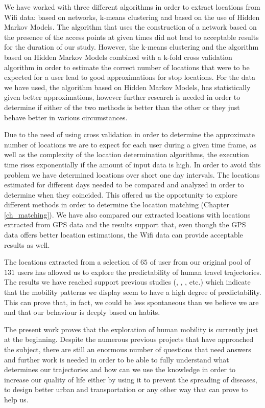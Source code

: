 We have worked with three different algorithms in order to extract locations
from Wifi data: based on networks, k-means clustering and based on the use of
Hidden Markov Models. The algorithm that uses the construction of a network
based on the presence of the access points at given times did not lead to
acceptable results for the duration of our study. However, the k-means
clustering and the algorithm based on Hidden Markov Models combined with a
k-fold cross validation algorithm in order to estimate the correct number of
locations that were to be expected for a user lead to good approximations for
stop locations. For the data we have used, the algorithm based on Hidden Markov
Models, has statistically given better approximations, however further research
is needed in order to determine if either of the two methods is better than the
other or they just behave better in various circumstances.

Due to the need of using cross validation in order to determine the approximate
number of locations we are to expect for each user during a given time frame, as
well as the complexity of the location determination algorithms, the execution
time rises exponentially if the amount of input data is high. In order to avoid
this problem we have determined locations over short one day intervals. The
locations estimated for different days needed to be compared and analyzed in
order to determine when they coincided. This offered us the opportunity to
explore different methods in order to determine the location matching (Chapter
\ref{ch_matching}). We have also compared our extracted locations with locations
extracted from GPS data and the results support that, even though the GPS data
offers better location estimations, the Wifi data can provide acceptable
results as well.

The locations extracted from a selection of $65$ of user from our original pool
of $131$ users has allowed us to explore the predictability of human travel
trajectories. The results we have reached support previous studies
(\cite{Barabasi10}, \cite{Barabasi08}, \cite{Sinatra14}, \cite{Brockmann06}
etc.) which indicate that the mobility patterns we display seem to have a high
degree of predictability. This can prove that, in fact, we could be less
spontaneous than we believe we are and that our behaviour is deeply based on
habits.

The present work proves that the exploration of human mobility is currently just
at the beginning. Despite the numerous previous projects that have approached
the subject, there are still an enormous number of questions that need answers
and further work is needed in order to be able to fully understand what
determines our trajectories and how can we use the knowledge in order to
increase our quality of life either by using it to prevent the spreading of
diseases, to design better urban and transportation or any other way that can
prove to help us.
